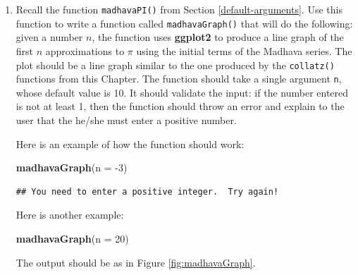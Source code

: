 \documentclass[]{book}
\makeatletter
\newenvironment{Shaded}{\begin{snugshade}}{\end{snugshade}}
\newcommand{\KeywordTok}[1]{\textcolor[rgb]{0.13,0.29,0.53}{\textbf{{#1}}}}
\newcommand{\DataTypeTok}[1]{\textcolor[rgb]{0.13,0.29,0.53}{{#1}}}
\newcommand{\DecValTok}[1]{\textcolor[rgb]{0.00,0.00,0.81}{{#1}}}
\newcommand{\NormalTok}[1]{{#1}}
\newenvironment{kframe}{%
\medskip{}
\setlength{\fboxsep}{.8em}
 \def\at@end@of@kframe{}%
 \ifinner\ifhmode%
  \def\at@end@of@kframe{\end{minipage}}%
  \begin{minipage}{\columnwidth}%
 \fi\fi%
 \def\FrameCommand##1{\hskip\@totalleftmargin \hskip-\fboxsep
 \colorbox{shadecolor}{##1}\hskip-\fboxsep
     \hskip-\linewidth \hskip-\@totalleftmargin \hskip\columnwidth}%
 \MakeFramed {\advance\hsize-\width
   \@totalleftmargin\z@ \linewidth\hsize
   \@setminipage}}%
 {\par\unskip\endMakeFramed%
 \at@end@of@kframe}
\renewenvironment{Shaded}{\begin{kframe}}{\end{kframe}}
\theoremstyle{definition}
\theoremstyle{definition}
\theoremstyle{remark}
\makeatother
\begin{document}
{\begin{enumerate}
  \begin{quote}
  1 bottle of beer!
  \end{quote}

  \begin{quote}
  Take it down and pass it around:
  \end{quote}

  \begin{quote}
  No more bottles of beer on the wall.
  \end{quote}

  Make sure to get the lyrics exactly right. For example, it's ``1
  bottle'', not ``1 bottles''.
\item
  Recall the function \texttt{madhavaPI()} from Section
  \ref{default-arguments}. Use this function to write a function called
  \texttt{madhavaGraph()} that will do the following: given a number
  \(n\), the function uses \textbf{ggplot2} to produce a line graph of
  the first \(n\) approximations to \(\pi\) using the initial terms of
  the Madhava series. The plot should be a line graph similar to the one
  produced by the \texttt{collatz()} functions from this Chapter. The
  function should take a single argument \texttt{n}, whose default value
  is 10. It should validate the input: if the number entered is not at
  least 1, then the function should throw an error and explain to the
  user that the he/she must enter a positive number.

  Here is an example of how the function should work:

\begin{Shaded}
\begin{Highlighting}[]
\KeywordTok{madhavaGraph}\NormalTok{(}\DataTypeTok{n =} \NormalTok{-}\DecValTok{3}\NormalTok{)}
\end{Highlighting}
\end{Shaded}

\begin{verbatim}
## You need to enter a positive integer.  Try again!
\end{verbatim}

  Here is another example:

\begin{Shaded}
\begin{Highlighting}[]
\KeywordTok{madhavaGraph}\NormalTok{(}\DataTypeTok{n =} \DecValTok{20}\NormalTok{)}
\end{Highlighting}
\end{Shaded}

  The output should be as in Figure \ref{fig:madhavaGraph}.


\end{enumerate}}
\end{document}
